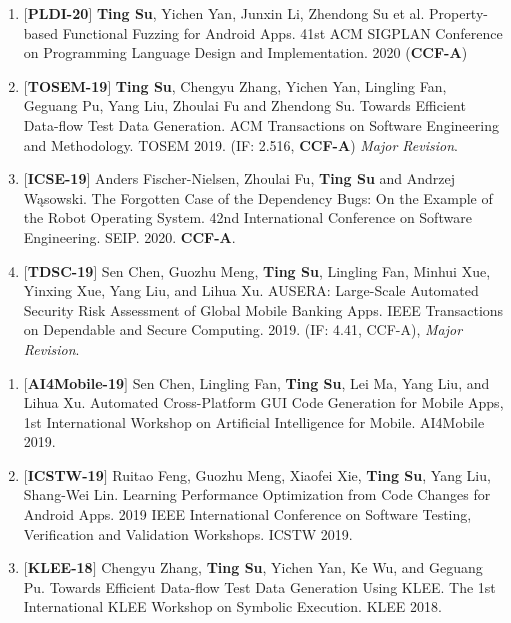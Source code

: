 \documentclass[margin]{res}
\begin{document}
\begin{resume}
\begin{enumerate}[leftmargin=*]
	\item $[$\textbf{PLDI-20}$]$ \textbf{Ting Su}, Yichen Yan, Junxin Li, Zhendong Su et al. Property-based Functional Fuzzing for Android Apps. 41st ACM SIGPLAN Conference on Programming Language Design and Implementation. 2020 (\textbf{CCF-A})
    \item $[$\textbf{TOSEM-19}$]$ \textbf{Ting Su}, Chengyu Zhang, Yichen Yan, Lingling Fan, Geguang Pu, Yang Liu, Zhoulai Fu and Zhendong Su. Towards Efficient Data-flow Test Data Generation. ACM Transactions on Software Engineering and Methodology. TOSEM 2019. (IF: 2.516, \textbf{CCF-A}) \emph{Major Revision}.
    \item $[$\textbf{ICSE-19}$]$ Anders Fischer-Nielsen, Zhoulai Fu, \textbf{Ting Su} and Andrzej Wąsowski. The Forgotten Case of the Dependency Bugs: On the Example of the Robot Operating System. 42nd International Conference on Software Engineering. SEIP. 2020. \textbf{CCF-A}.
    \item $[$\textbf{TDSC-19}$]$ Sen Chen, Guozhu Meng, \textbf{Ting Su}, Lingling Fan, Minhui Xue, Yinxing Xue, Yang Liu, and Lihua Xu. AUSERA: Large-Scale Automated Security Risk Assessment of Global Mobile Banking Apps. IEEE Transactions on Dependable and Secure Computing. 2019. (IF: 4.41, CCF-A), \emph{Major Revision}.
    
\end{enumerate}

\begin{enumerate}[leftmargin=*]
    \item $[$\textbf{AI4Mobile-19}$]$ Sen Chen, Lingling Fan, \textbf{Ting Su}, Lei Ma, Yang Liu, and Lihua Xu. Automated Cross-Platform GUI Code Generation for Mobile Apps, 1st International Workshop on Artificial Intelligence for Mobile. AI4Mobile 2019.
    \item $[$\textbf{ICSTW-19}$]$ Ruitao Feng, Guozhu Meng, Xiaofei Xie, \textbf{Ting Su}, Yang Liu, Shang-Wei Lin. Learning Performance Optimization from Code Changes for Android Apps. 2019 IEEE International Conference on Software Testing, Verification and Validation Workshops. ICSTW 2019.
    \item $[$\textbf{KLEE-18}$]$ Chengyu Zhang, \textbf{Ting Su}, Yichen Yan, Ke Wu, and Geguang Pu. Towards Efficient Data-flow Test Data Generation Using KLEE. The 1st International KLEE Workshop on Symbolic Execution. KLEE 2018.
\end{enumerate}


\end{resume}
\end{document}
